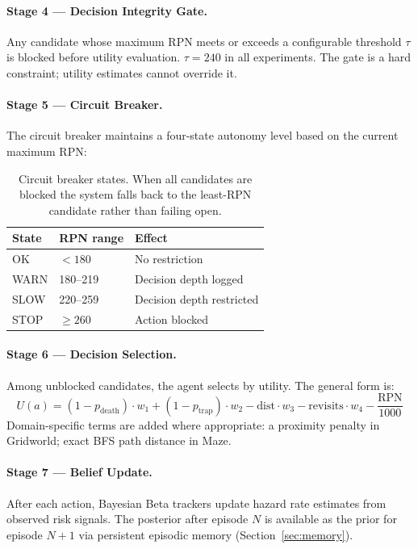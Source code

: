 \documentclass[11pt,letterpaper]{article}
\begin{document}
\paragraph{Stage 4 --- Decision Integrity Gate.}
Any candidate whose maximum RPN meets or exceeds a configurable threshold $\tau$
is blocked before utility evaluation. $\tau = 240$ in all experiments. The gate
is a hard constraint; utility estimates cannot override it.

\paragraph{Stage 5 --- Circuit Breaker.}
The circuit breaker maintains a four-state autonomy level based on the current
maximum RPN:

\begin{table}[H]
\centering
\begin{tabular}{lll}
\toprule
\textbf{State} & \textbf{RPN range} & \textbf{Effect} \\
\midrule
OK   & $< 180$   & No restriction \\
WARN & 180--219  & Decision depth logged \\
SLOW & 220--259  & Decision depth restricted \\
STOP & $\geq 260$ & Action blocked \\
\bottomrule
\end{tabular}
\caption{Circuit breaker states. When all candidates are blocked the system falls
back to the least-RPN candidate rather than failing open.}
\label{tab:circuit_breaker}
\end{table}

\paragraph{Stage 6 --- Decision Selection.}
Among unblocked candidates, the agent selects by utility. The general form is:
\begin{equation}
  U(a) = (1 - p_{\mathrm{death}}) \cdot w_1
       + (1 - p_{\mathrm{trap}}) \cdot w_2
       - \mathrm{dist} \cdot w_3
       - \mathrm{revisits} \cdot w_4
       - \frac{\mathrm{RPN}}{1000}
  \label{eq:utility}
\end{equation}
Domain-specific terms are added where appropriate: a proximity penalty in
Gridworld; exact BFS path distance in Maze.

\paragraph{Stage 7 --- Belief Update.}
After each action, Bayesian Beta trackers update hazard rate estimates from
observed risk signals. The posterior after episode $N$ is available as the
prior for episode $N+1$ via persistent episodic memory
(Section~\ref{sec:memory}).
\end{document}

